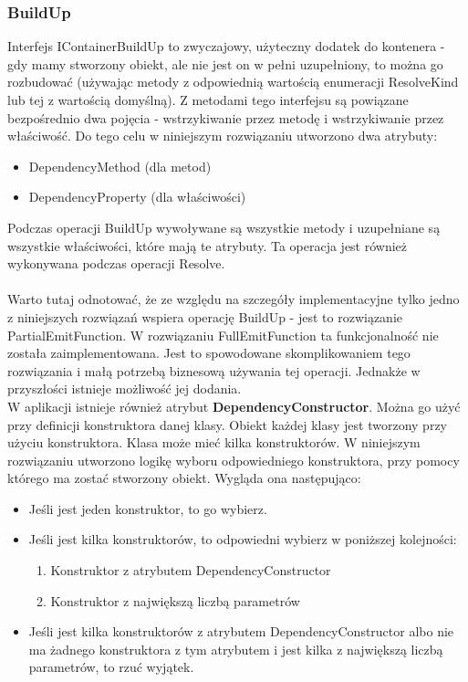\documentclass[12pt]{article}
\begin{document}
\subsubsection{BuildUp}
Interfejs IContainerBuildUp to zwyczajowy, użyteczny dodatek do kontenera - gdy mamy stworzony obiekt, ale nie jest on w pełni uzupełniony, to można go rozbudować (używając metody z odpowiednią wartością enumeracji ResolveKind lub tej z wartością domyślną). Z metodami tego interfejsu są powiązane bezpośrednio dwa pojęcia - wstrzykiwanie przez metodę i wstrzykiwanie przez właściwość. Do tego celu w niniejszym rozwiązaniu utworzono dwa atrybuty:
\begin{itemize}
	\item DependencyMethod (dla metod)
	\item DependencyProperty (dla właściwości)
\end{itemize}
Podczas operacji BuildUp wywoływane są wszystkie metody i uzupełniane są wszystkie właściwości, które mają te atrybuty. Ta operacja jest również wykonywana podczas operacji Resolve.\\
\\
Warto tutaj odnotować, że ze względu na szczegóły implementacyjne tylko jedno z niniejszych rozwiązań wspiera operację BuildUp - jest to rozwiązanie PartialEmitFunction. W rozwiązaniu FullEmitFunction ta funkcjonalność nie została zaimplementowana. Jest to spowodowane skomplikowaniem tego rozwiązania i małą potrzebą biznesową używania tej operacji. Jednakże w przyszłości istnieje możliwość jej dodania.\\

W aplikacji istnieje również atrybut \textbf{DependencyConstructor}. Można go użyć przy definicji konstruktora danej klasy. Obiekt każdej klasy jest tworzony przy użyciu konstruktora. Klasa może mieć kilka konstruktorów. W niniejszym rozwiązaniu utworzono logikę wyboru odpowiedniego konstruktora, przy pomocy którego ma zostać stworzony obiekt. Wygląda ona następująco:
\begin{itemize}
	\item Jeśli jest jeden konstruktor, to go wybierz.
	\item Jeśli jest kilka konstruktorów, to odpowiedni wybierz w poniższej kolejności:
	\begin{enumerate}
		\item Konstruktor z atrybutem DependencyConstructor
		\item Konstruktor z największą liczbą parametrów
	\end{enumerate}
	\item Jeśli jest kilka konstruktorów z atrybutem DependencyConstructor albo nie ma żadnego konstruktora z tym atrybutem i jest kilka z największą liczbą parametrów, to rzuć wyjątek.
\end{itemize}
\end{document}
